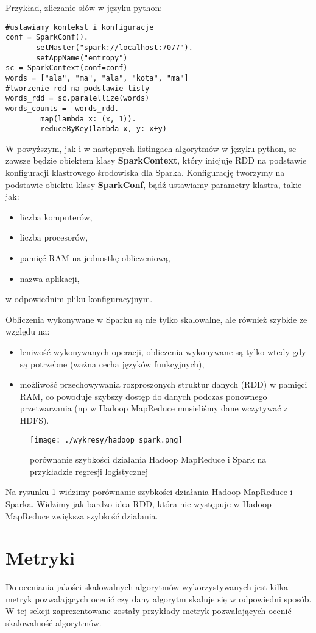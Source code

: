 \documentclass[magisterska]{pracamgr}
\theoremstyle{plain}
\theoremstyle{definition}
\theoremstyle{remark}
\begin{document}
Przykład, zliczanie słów w języku python:
\begin{lstlisting}
#ustawiamy kontekst i konfiguracje
conf = SparkConf().
       setMaster("spark://localhost:7077").
       setAppName("entropy")
sc = SparkContext(conf=conf)
words = ["ala", "ma", "ala", "kota", "ma"]
#tworzenie rdd na podstawie listy
words_rdd = sc.paralellize(words)  
words_counts =  words_rdd.
		map(lambda x: (x, 1)).
		reduceByKey(lambda x, y: x+y)
\end{lstlisting}

W powyższym, jak i w następnych listingach algorytmów w języku python, sc zawsze będzie obiektem klasy \textbf{SparkContext}, który inicjuje
RDD na podstawie konfiguracji klastrowego środowiska dla Sparka. Konfigurację tworzymy na podstawie obiektu klasy \textbf{SparkConf}, bądź
ustawiamy parametry klastra, takie jak:
\begin{itemize}
 \item liczba komputerów,
 \item liczba procesorów,
 \item pamięć RAM na jednostkę obliczeniową,
 \item nazwa aplikacji,
\end{itemize}
w odpowiednim pliku konfiguracyjnym. 


Obliczenia wykonywane w Sparku są nie tylko skalowalne, ale również szybkie ze względu na:
\begin{itemize}
 \item leniwość wykonywanych operacji, obliczenia wykonywane są tylko wtedy gdy są potrzebne (ważna cecha
 języków funkcyjnych),
 \item możliwość przechowywania rozproszonych struktur danych (RDD) w pamięci RAM, co powoduje szybszy dostęp do danych
 podczas ponownego przetwarzania (np w Hadoop MapReduce musieliśmy dane wczytywać z HDFS).
\end{itemize}


\begin{figure}\label{fig:hadoop_spark}
 \caption{porównanie szybkości działania Hadoop MapReduce i Spark na przykładzie regresji logistycznej}
 \texttt{[image: ./wykresy/hadoop\_spark.png]}
\end{figure}

Na rysunku \ref{fig:hadoop_spark} widzimy porównanie szybkości działania Hadoop MapReduce i Sparka. Widzimy jak bardzo idea RDD, która 
nie występuje w Hadoop MapReduce zwiększa szybkość działania.

\section{Metryki}
Do oceniania jakości skalowalnych algorytmów wykorzystywanych jest kilka metryk pozwalających
 ocenić czy dany algorytm skaluje się w odpowiedni sposób. W tej sekcji zaprezentowane zostały przykłady
 metryk pozwalających ocenić skalowalność algorytmów.
 
\end{document}
